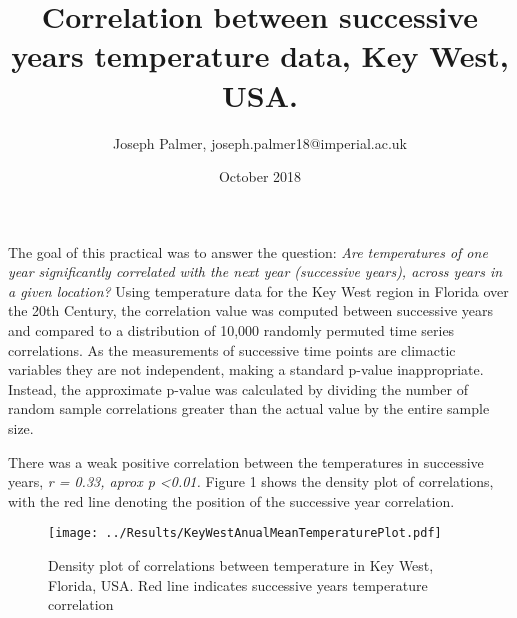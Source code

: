 \documentclass[12pt]{article}
\title{Correlation between successive years temperature data, Key West, USA.}
\author{Joseph Palmer, joseph.palmer18@imperial.ac.uk}
\date{October 2018}
\begin{document}
	\maketitle
	The goal of this practical was to answer the question: \textit{Are temperatures of one year significantly correlated with the next year (successive years), across years in a given location?} Using temperature data for the Key West region in Florida over the 20th Century, the correlation value was computed between successive years and compared to a distribution of 10,000 randomly permuted time series correlations. As the measurements of successive time points are climactic variables they are not independent, making a standard p-value inappropriate. Instead, the approximate p-value was calculated by dividing the number of random sample correlations greater than the actual value by the entire sample size. 
	
	
	There was a weak positive correlation between the temperatures in successive years, \textit{r = 0.33, aprox p \textless 0.01.} Figure 1 shows the density plot of correlations, with the red line denoting the position of the successive year correlation.
	
	\begin{figure}[ht]
		\texttt{[image: ../Results/KeyWestAnualMeanTemperaturePlot.pdf]}
		\caption{Density plot of correlations between temperature in Key West, Florida, USA. Red line indicates successive years temperature correlation}
	\end{figure}
		
\end{document}

